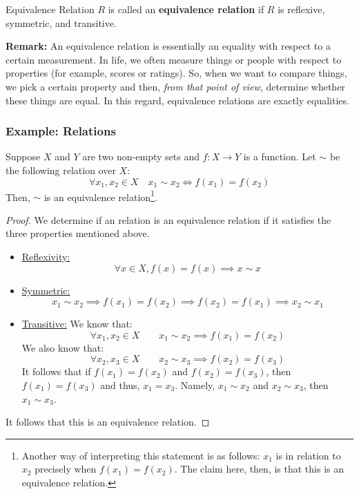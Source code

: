 \documentclass[letterpaper]{article}
\begin{document}
\begin{definition}{Equivalence Relation}{}
    $R$ is called an \textbf{equivalence relation} if $R$ is reflexive, symmetric, and transitive. 
\end{definition}

\textbf{Remark:} An equivalence relation is essentially an equality with respect to a certain measurement. In life, we often measure things or people with respect to properties (for example, scores or ratings). So, when we want to compare things, we pick a certain property and then, \emph{from that point of view}, determine whether these things are equal. In this regard, equivalence relations are exactly equalities. 

\subsubsection{Example: Relations}
Suppose $X$ and $Y$ are two non-empty sets and $f: X \to Y$ is a function. Let $\sim$ be the following relation over $X$:
\[\forall x_1, x_2 \in X \quad x_1 \sim x_2 \iff f(x_1) = f(x_2)\]
Then, $\sim$ is an equivalence relation\footnote{Another way of interpreting this statement is as follows: $x_1$ is in relation to $x_2$ precisely when $f(x_1) = f(x_2)$. The claim here, then, is that this is an equivalence relation.}.

\begin{proof}
    We determine if an relation is an equivalence relation if it satisfies the three properties mentioned above.
    \begin{itemize}
        \item \underline{Reflexivity:}
        \[\forall x \in X, f(x) = f(x) \implies x \sim x\]

        \item \underline{Symmetric:}
        \[x_1 \sim x_2 \implies f(x_1) = f(x_2) \implies f(x_2) = f(x_1) \implies x_2 \sim x_1\]

        \item \underline{Transitive:}
        We know that:
        \[\forall x_1, x_2 \in X \qquad x_1 \sim x_2 \implies f(x_1) = f(x_2)\]
        We also know that:
        \[\forall x_2, x_3 \in X \qquad x_2 \sim x_3 \implies f(x_2) = f(x_3)\]
        It follows that if $f(x_1) = f(x_2)$ and $f(x_2) = f(x_3)$, then $f(x_1) = f(x_3)$ and thus, $x_1 = x_3$. Namely, $x_1 \sim x_2$ and $x_2 \sim x_3$, then $x_1 \sim x_3$. 
    \end{itemize}
    It follows that this is an equivalence relation. 
\end{proof}
\end{document}
